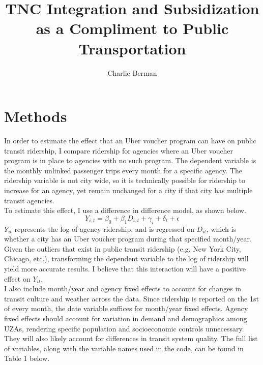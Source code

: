 \documentclass [11pt]{article}
\title{TNC Integration and Subsidization as a Compliment to Public Transportation}
\author{Charlie Berman}
\begin{document}
\maketitle

\section*{Methods}
In order to estimate the effect that an Uber voucher program can have on public transit ridership, I compare ridership for agencies where an Uber voucher program is in place to agencies with no such program. The dependent variable is the monthly unlinked passenger trips every month for a specific agency. The ridership variable is not city wide, so it is technically possible for ridership to increase for an agency, yet remain unchanged for a city if that city has multiple transit agencies. \\ %
\indent To estimate this effect, I use a difference in difference model, as shown below. 
$$Y_{i,t} = \beta_0 + \beta_1 D_{i,t} + \gamma_i + \delta_t + \epsilon$$
$Y_{it}$ represents the log of agency ridership, and is regressed on $D_{it}$, which is whether a city has an Uber voucher program during that specified month/year. Given the outliers that exist in public transit ridership (e.g. New York City, Chicago, etc.), transforming the dependent variable to the log of ridership will yield more accurate results. I believe that this interaction will have a positive effect on $Y_{it}$. \\
\indent I also include month/year and agency fixed effects to account for changes in transit culture and weather across the data. Since ridership is reported on the 1st of every month, the date variable suffices for month/year fixed effects. Agency fixed effects should account for variation in demand and demographics among UZAs, rendering specific population and socioeconomic controls unnecessary. They will also likely account for differences in transit system quality. The full list of variables, along with the variable names used in the code, can be found in Table 1 below.\\
\end{document}
